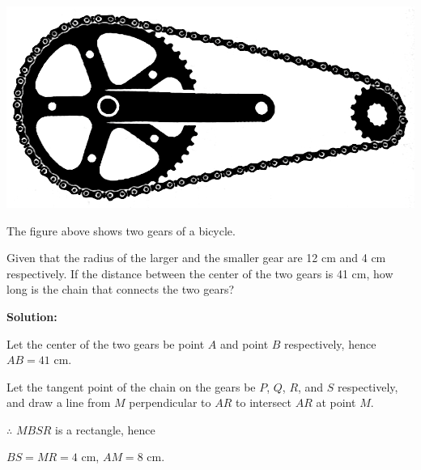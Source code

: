 \documentclass{report}
\newcommand{\sol}{\noindent\textbf{Solution:} }
\begin{document}
\begin{question}
    \begin{center}
        \includegraphics[scale=0.14]{assets/8-22.png}
    \end{center}
    \noindent The figure above shows two gears of a bicycle.

    \noindent Given that the radius of the larger and the smaller gear are 12 cm and 4 cm respectively. If the distance between the center of the two gears is 41 cm, how long is the chain that connects the two gears?

    \sol{}

    \begin{vwcol}[widths={0.6,0.4},rule=0pt,sep=1em]
        \noindent Let the center of the two gears be point $A$ and point $B$ respectively, hence $AB = 41$ cm.
    
    \noindent Let the tangent point of the chain on the gears be $P$, $Q$, $R$, and $S$ respectively, and draw a line from $M$ perpendicular to $AR$ to intersect $AR$ at point $M$.
    
    \noindent $\therefore$ $MBSR$ is a rectangle, hence 
    
    $BS = MR = 4$ cm, $AM = 8$ cm.


\end{vwcol}
\end{question}
\end{document}
